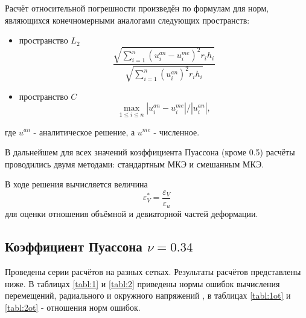 \documentclass[a4paper,14pt]{extarticle}
\begin{document}
Расчёт относительной погрешности произведён по формулам для норм, являющихся конечномерными аналогами следующих пространств:
\newpage
\begin{itemize}
\item пространство $L_2$
\begin{equation}\label{Error_Ot_L2}
\dfrac{\sqrt{\sum_{i=1}^{n} (u_i^{an}-u_i^{me})^2 r_i h_{i}}}{\sqrt{\sum_{i=1}^{n} (u_i^{an})^2 r_i h_{i}}}
\end{equation}
\item пространство $C$
\begin{equation}\label{Error_Ot_C1}
\max_{1\leq i \leq n} \left|u_i^{an}-u_i^{me}\right| /  \left|u_i^{an}\right|,
\end{equation}
\end{itemize}
где $u^{an}$ - аналитическое решение, а $u^{me}$ - численное.

В дальнейшем для всех значений коэффициента Пуассона (кроме 0.5) расчёты проводились двумя методами: стандартным МКЭ и смешанным МКЭ.

В ходе решения вычисляется величина
\begin{equation}\label{EpsZVUpr}
\varepsilon^{*}_{V}=\dfrac{\varepsilon_{V}}{\varepsilon_{u}}
\end{equation}
для оценки отношения объёмной и девиаторной частей деформации.

\newpage
\subsection{Коэффициент Пуассона $\nu=0.34$}

Проведены серии расчётов на разных сетках. Результаты расчётов представлены ниже. В таблицах \ref{tabl:1} и \ref{tabl:2} приведены нормы ошибок вычисления перемещений, радиального и окружного напряжений , в таблицах \ref{tabl:1ot} и \ref{tabl:2ot} - отношения норм ошибок.
\end{document}

